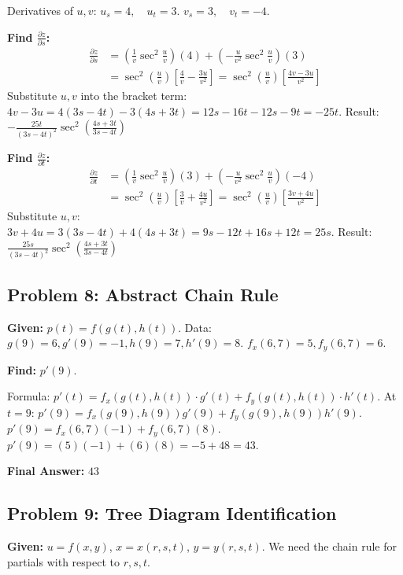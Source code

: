 \documentclass[11pt, letterpaper]{article}
\theoremstyle{definition}
\begin{document}
Derivatives of $u, v$:
$u_s = 4, \quad u_t = 3$.
$v_s = 3, \quad v_t = -4$.

\textbf{Find $\frac{\partial z}{\partial s}$:}
\begin{align*}
\frac{\partial z}{\partial s} &= \left(\frac{1}{v}\sec^2\frac{u}{v}\right)(4) + \left(-\frac{u}{v^2}\sec^2\frac{u}{v}\right)(3) \\
&= \sec^2\left(\frac{u}{v}\right) \left[ \frac{4}{v} - \frac{3u}{v^2} \right] = \sec^2\left(\frac{u}{v}\right) \left[ \frac{4v - 3u}{v^2} \right]
\end{align*}
Substitute $u, v$ into the bracket term:
$4v - 3u = 4(3s-4t) - 3(4s+3t) = 12s - 16t - 12s - 9t = -25t$.
Result: $\boxed{-\frac{25t}{(3s-4t)^2}\sec^2\left(\frac{4s+3t}{3s-4t}\right)}$

\textbf{Find $\frac{\partial z}{\partial t}$:}
\begin{align*}
\frac{\partial z}{\partial t} &= \left(\frac{1}{v}\sec^2\frac{u}{v}\right)(3) + \left(-\frac{u}{v^2}\sec^2\frac{u}{v}\right)(-4) \\
&= \sec^2\left(\frac{u}{v}\right) \left[ \frac{3}{v} + \frac{4u}{v^2} \right] = \sec^2\left(\frac{u}{v}\right) \left[ \frac{3v + 4u}{v^2} \right]
\end{align*}
Substitute $u, v$:
$3v + 4u = 3(3s-4t) + 4(4s+3t) = 9s - 12t + 16s + 12t = 25s$.
Result: $\boxed{\frac{25s}{(3s-4t)^2}\sec^2\left(\frac{4s+3t}{3s-4t}\right)}$


\subsection*{Problem 8: Abstract Chain Rule}
\textbf{Given:} $p(t) = f(g(t), h(t))$.
Data: $g(9)=6, g'(9)=-1, h(9)=7, h'(9)=8$.
$f_x(6,7)=5, f_y(6,7)=6$.

\textbf{Find:} $p'(9)$.

Formula: $p'(t) = f_x(g(t), h(t)) \cdot g'(t) + f_y(g(t), h(t)) \cdot h'(t)$.
At $t=9$:
$p'(9) = f_x(g(9), h(9)) g'(9) + f_y(g(9), h(9)) h'(9)$.
$p'(9) = f_x(6, 7)(-1) + f_y(6, 7)(8)$.
$p'(9) = (5)(-1) + (6)(8) = -5 + 48 = 43$.

\textbf{Final Answer:} $\boxed{43}$


\subsection*{Problem 9: Tree Diagram Identification}
\textbf{Given:} $u = f(x,y)$, $x=x(r,s,t)$, $y=y(r,s,t)$.
We need the chain rule for partials with respect to $r, s, t$.
\end{document}
